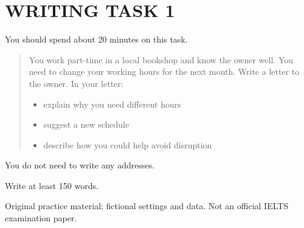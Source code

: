 \section*{WRITING TASK 1}
You should spend about 20 minutes on this task.

\begin{quote}\large You work part-time in a local bookshop and know the owner well. You need to change your working hours for the next month. Write a letter to the owner. In your letter:
\begin{itemize}
\item explain why you need different hours
\item suggest a new schedule
\item describe how you could help avoid disruption
\end{itemize}
\end{quote}
You do not need to write any addresses.

Write at least 150 words.
\par\bigskip
{\footnotesize\color{gray} Original practice material; fictional settings and data. Not an official IELTS examination paper.}
